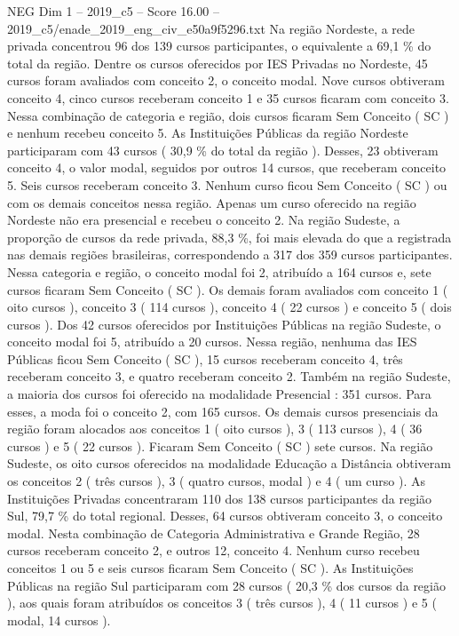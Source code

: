 \begin{textsample}{NEG Dim 1 – 2019\_c5 – Score 16.00 – 2019\_c5/enade\_2019\_eng\_civ\_e50a9f5296.txt}
Na região Nordeste, a rede privada concentrou 96 dos 139 cursos participantes, o equivalente a 69,1 \% do total da região.
Dentre os cursos oferecidos por IES Privadas no Nordeste, 45 cursos foram avaliados com conceito 2, o conceito modal.
Nove cursos obtiveram conceito 4, cinco cursos receberam conceito 1 e 35 cursos ficaram com conceito 3.
Nessa combinação de categoria e região, dois cursos ficaram Sem Conceito ( SC ) e nenhum recebeu conceito 5.
As Instituições Públicas da região Nordeste participaram com 43 cursos ( 30,9 \% do total da região ).
Desses, 23 obtiveram conceito 4, o valor modal, seguidos por outros 14 cursos, que receberam conceito 5.
Seis cursos receberam conceito 3.
Nenhum curso ficou Sem Conceito ( SC ) ou com os demais conceitos nessa região.
Apenas um curso oferecido na região Nordeste não era presencial e recebeu o conceito 2.
Na região Sudeste, a proporção de cursos da rede privada, 88,3 \%, foi mais elevada do que a registrada nas demais regiões brasileiras, correspondendo a 317 dos 359 cursos participantes.
Nessa categoria e região, o conceito modal foi 2, atribuído a 164 cursos e, sete cursos ficaram Sem Conceito ( SC ).
Os demais foram avaliados com conceito 1 ( oito cursos ), conceito 3 ( 114 cursos ), conceito 4 ( 22 cursos ) e conceito 5 ( dois cursos ).
Dos 42 cursos oferecidos por Instituições Públicas na região Sudeste, o conceito modal foi 5, atribuído a 20 cursos.
Nessa região, nenhuma das IES Públicas ficou Sem Conceito ( SC ), 15 cursos receberam conceito 4, três receberam conceito 3, e quatro receberam conceito 2.
Também na região Sudeste, a maioria dos cursos foi oferecido na modalidade Presencial : 351 cursos.
Para esses, a moda foi o conceito 2, com 165 cursos.
Os demais cursos presenciais da região foram alocados aos conceitos 1 ( oito cursos ), 3 ( 113 cursos ), 4 ( 36 cursos ) e 5 ( 22 cursos ).
Ficaram Sem Conceito ( SC ) sete cursos.
Na região Sudeste, os oito cursos oferecidos na modalidade Educação a Distância obtiveram os conceitos 2 ( três cursos ), 3 ( quatro cursos, modal ) e 4 ( um curso ).
As Instituições Privadas concentraram 110 dos 138 cursos participantes da região Sul, 79,7 \% do total regional.
Desses, 64 cursos obtiveram conceito 3, o conceito modal.
Nesta combinação de Categoria Administrativa e Grande Região, 28 cursos receberam conceito 2, e outros 12, conceito 4.
Nenhum curso recebeu conceitos 1 ou 5 e seis cursos ficaram Sem Conceito ( SC ).
As Instituições Públicas na região Sul participaram com 28 cursos ( 20,3 \% dos cursos da região ), aos quais foram atribuídos os conceitos 3 ( três cursos ), 4 ( 11 cursos ) e 5 ( modal, 14 cursos ).

\end{textsample}
